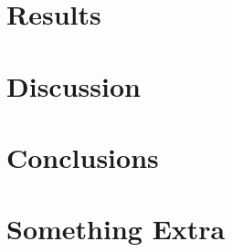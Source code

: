 \documentclass{kththesis}
\begin{document}
\chapter{Results}

\chapter{Discussion}

\chapter{Conclusions}

\printbibliography[heading=bibintoc]

\appendix

\chapter{Something Extra}

\tailmatter
\end{document}
